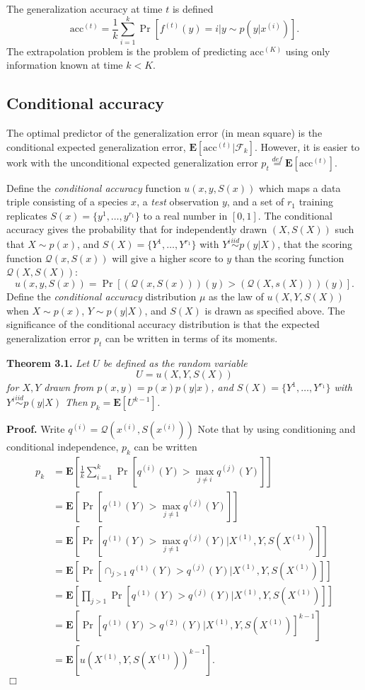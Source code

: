 \documentclass{article}
\newcommand{\E}{\textbf{E}}
\begin{document}
The generalization accuracy at time $t$ is defined
\[
\text{acc}^{(t)} = \frac{1}{k}\sum_{i=1}^k \Pr[f^{(t)}(y) = i|y \sim p(y|x^{(i)})].
\]
The extrapolation problem is the problem of predicting $\text{acc}^{(K)}$ using
only information known at time $k < K$.

\subsection{Conditional accuracy}

The optimal predictor of the generalization error (in mean square) is
the conditional expected generalization error,
$\E[\text{acc}^{(t)}|\mathcal{F}_k]$.  However, it is easier to work with the
unconditional expected generalization error $p_t \stackrel{def}{=}
\E[\text{acc}^{(t)}]$.

Define the \emph{conditional accuracy} function $u(x, y, S(x))$ which
maps a data triple consisting of a species $x$, a \emph{test}
observation $y$, and a set of $r_1$ training replicates $S(x) =
\{y^{1}, \hdots, y^{r_1}\}$ to a real number in $[0,1]$.  The
conditional accuracy gives the probability that for independently
drawn $(X, S(X))$ such that $X \sim p(x)$, and $S(X) = \{Y^1,\hdots,
Y^{r_1}\}$ with $Y^i \stackrel{iid}{\sim} p(y|X)$, that the scoring
function $\mathcal{Q}(x, S(x))$ will give a higher score to $y$ than
the scoring function $\mathcal{Q}(X, S(X))$:
\[
u(x, y, S(x)) = \Pr[(\mathcal{Q}(x, S(x)))(y) > (\mathcal{Q}(X, s(X)))(y)].
\]
Define the \emph{conditional accuracy} distribution $\mu$ as the law of
$u(X, Y, S(X))$ when $X \sim p(x)$, $Y\sim p(y|X)$, and $S(X)$ is
drawn as specified above.  The significance of the conditional
accuracy distribution is that the expected generalization error $p_t$
can be written in terms of its moments.

\noindent\textbf{Theorem 3.1.} \emph{
Let $U$ be defined as the random variable
\[U = u(X, Y, S(X))\]
for $X, Y$ drawn from $p(x, y) = p(x) p(y|x)$,
and $S(X) = \{Y^1,\hdots, Y^{r_1}\}$ with $Y^i \stackrel{iid}{\sim} p(y|X)$
Then $p_k = \E[U^{k-1}]$.
}

\noindent\textbf{Proof.}  
Write $q^{(i)} = \mathcal{Q}(x^{(i)}, S(x^{(i)}))$
Note that by using conditioning and
conditional independence, $p_k$ can be written
\begin{align*}
p_k &= \E\left[ \frac{1}{k}\sum_{i=1}^k  \Pr[q^{(i)}(Y) > \max_{j\neq i} q^{(j)}(Y)] \right]
\\&= \E\left[ \Pr[q^{(1)}(Y) > \max_{j\neq 1} q^{(j)}(Y)] \right]
\\&= \E[\Pr[q^{(1)}(Y) > \max_{j\neq 1} q^{(j)}(Y)|X^{(1)}, Y, S(X^{(1)})]]
\\&= \E[\Pr[\cap_{j > 1} q^{(1)}(Y) > q^{(j)}(Y)|X^{(1)}, Y, S(X^{(1)})]]
\\&= \E[\prod_{j > 1}\Pr[q^{(1)}(Y) > q^{(j)}(Y)|X^{(1)}, Y, S(X^{(1)})]]
\\&= \E[\Pr[q^{(1)}(Y) > q^{(2)}(Y)|X^{(1)}, Y, S(X^{(1)})]^{k-1}]
\\&= \E[u(X^{(1)}, Y, S(X^{(1)}))^{k-1}].
\end{align*}
$\Box$
\end{document}
